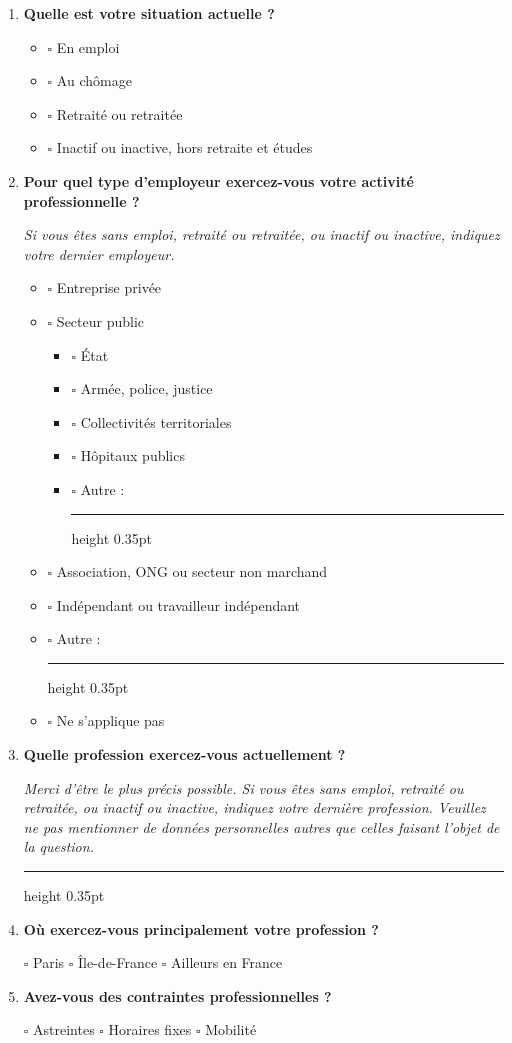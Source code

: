 \documentclass[12pt,a4paper]{article}
\newcommand{\Case}{\(\square\)}
\newcommand{\Ligne}{\leavevmode\leaders\hrule height 0.35pt\hfill\kern0pt}
\newcommand{\Question}[1]{\item \textbf{#1}\par\vspace{0.1em}}
\newcommand{\Consigne}[1]{\par{\small\itshape #1}\par}
\begin{document}
\begin{enumerate}[label=\textbf{\arabic*.},leftmargin=0pt,itemindent=1.9em,labelwidth=1.4em,labelsep=0.5em]
\Question{Quelle est votre situation actuelle ?}

\begin{itemize}[leftmargin=1.5cm]
    \item[] \Case{} En emploi
    \item[] \Case{} Au chômage
    \item[] \Case{} Retraité ou retraitée
    \item[] \Case{} Inactif ou inactive, hors retraite et études
\end{itemize}

\Question{Pour quel type d'employeur exercez-vous votre activité professionnelle ?}

\Consigne{Si vous êtes sans emploi, retraité ou retraitée, ou inactif ou inactive, indiquez votre dernier employeur.}

\begin{itemize}[leftmargin=1.5cm]
    \item[] \Case{} Entreprise privée
    \item[] \Case{} Secteur public
        \begin{itemize}[leftmargin=1.2cm]
            \item[] \Case{} État
            \item[] \Case{} Armée, police, justice
            \item[] \Case{} Collectivités territoriales
            \item[] \Case{} Hôpitaux publics
            \item[] \Case{} Autre : \Ligne
        \end{itemize}
    \item[] \Case{} Association, ONG ou secteur non marchand
    \item[] \Case{} Indépendant ou travailleur indépendant
    \item[] \Case{} Autre : \Ligne
    \item[] \Case{} Ne s'applique pas
\end{itemize}

\Question{Quelle profession exercez-vous actuellement ?}

\Consigne{Merci d'être le plus précis possible. Si vous êtes sans emploi, retraité ou retraitée, ou inactif ou inactive, indiquez votre dernière profession. Veuillez ne pas mentionner de données personnelles autres que celles faisant l'objet de la question.}

\Ligne

\Question{Où exercez-vous principalement votre profession ?}

\Case{} Paris \hspace{1cm} \Case{} Île-de-France \hspace{1cm} \Case{} Ailleurs en France

\Question{Avez-vous des contraintes professionnelles ?}

\Case{} Astreintes \hspace{1cm} \Case{} Horaires fixes \hspace{1cm} \Case{} Mobilité

\end{enumerate}
\end{document}
